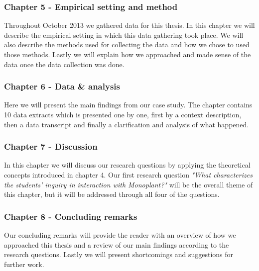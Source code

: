 \subsubsection*{Chapter 5 - Empirical setting and method}

Throughout October 2013 we gathered data for this thesis. In this chapter we will describe the empirical setting in which this data gathering took place. We will also describe the methods used for collecting the data and how we chose to used those methods. Lastly we will explain how we approached and made sense of the data once the data collection was done. 

\subsubsection*{Chapter 6 - Data \& analysis}
Here we will present the main findings from our case study. The chapter contains 10 data extracts which is presented one by one, first by a context description, then a data transcript and finally a clarification and analysis of what happened. 

\subsubsection*{Chapter 7 - Discussion}
In this chapter we will discuss our research questions by applying the theoretical concepts introduced in chapter 4. Our first research question \emph{"What characterizes the students’ inquiry in interaction with Monoplant?"} will be the overall theme of this chapter, but it will be addressed through all four of the questions.

\subsubsection*{Chapter 8 - Concluding remarks}
Our concluding remarks will provide the reader with an overview of how we approached this thesis and a review of our main findings according to the research questions. Lastly we will present shortcomings and suggestions for further work.
